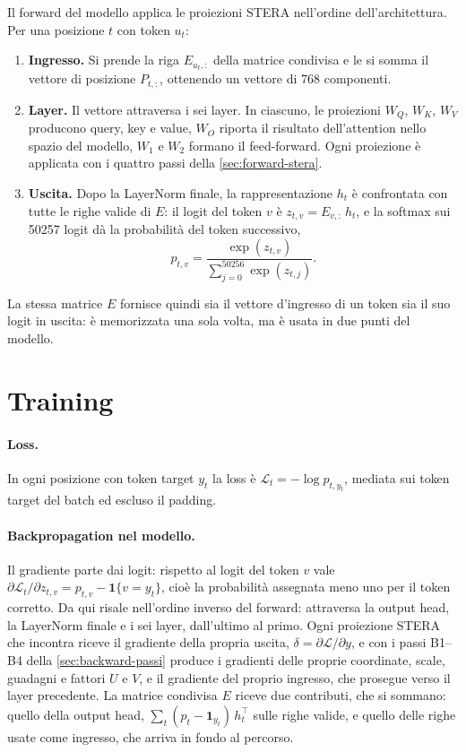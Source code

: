 Il forward del modello applica le proiezioni STERA nell'ordine dell'architettura. Per una posizione $t$ con token $u_t$:
\begin{enumerate}
\item \textbf{Ingresso.} Si prende la riga $E_{u_t,:}$ della matrice condivisa e le si somma il vettore di posizione $P_{t,:}$, ottenendo un vettore di 768 componenti.
\item \textbf{Layer.} Il vettore attraversa i sei layer. In ciascuno, le proiezioni $W_Q$, $W_K$, $W_V$ producono query, key e value, $W_O$ riporta il risultato dell'attention nello spazio del modello, $W_1$ e $W_2$ formano il feed-forward. Ogni proiezione è applicata con i quattro passi della \autoref{sec:forward-stera}.
\item \textbf{Uscita.} Dopo la LayerNorm finale, la rappresentazione $h_t$ è confrontata con tutte le righe valide di $E$: il logit del token $v$ è $z_{t,v}=E_{v,:}\,h_t$, e la softmax sui \num{50257} logit dà la probabilità del token successivo,
\[
p_{t,v}=\frac{\exp(z_{t,v})}{\sum_{j=0}^{50256}\exp(z_{t,j})}.
\]
\end{enumerate}
La stessa matrice $E$ fornisce quindi sia il vettore d'ingresso di un token sia il suo logit in uscita: è memorizzata una sola volta, ma è usata in due punti del modello.

\section{Training}
\label{sec:addestramento-stera30m}

\paragraph{Loss.} In ogni posizione con token target $y_t$ la loss è $\mathcal L_t=-\log p_{t,y_t}$, mediata sui token target del batch ed escluso il padding.

\paragraph{Backpropagation nel modello.} Il gradiente parte dai logit: rispetto al logit del token $v$ vale $\partial\mathcal L_t/\partial z_{t,v}=p_{t,v}-\mathbf 1\{v=y_t\}$, cioè la probabilità assegnata meno uno per il token corretto. Da qui risale nell'ordine inverso del forward: attraversa la output head, la LayerNorm finale e i sei layer, dall'ultimo al primo. Ogni proiezione STERA che incontra riceve il gradiente della propria uscita, $\delta=\partial\mathcal L/\partial y$, e con i passi B1--B4 della \autoref{sec:backward-passi} produce i gradienti delle proprie coordinate, scale, guadagni e fattori $U$ e $V$, e il gradiente del proprio ingresso, che prosegue verso il layer precedente. La matrice condivisa $E$ riceve due contributi, che si sommano: quello della output head, $\sum_t(p_t-\mathbf 1_{y_t})\,h_t^\top$ sulle righe valide, e quello delle righe usate come ingresso, che arriva in fondo al percorso.

